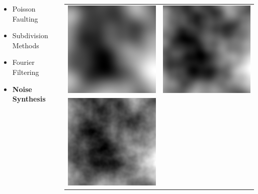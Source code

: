 \documentclass[aspectratio=169]{beamer}
\newenvironment{myframe}[1][t]{\begin{frame}[#1]{\secname}{\subsecname}}{\end{frame}}
\begin{document}
	\begin{myframe}
		\begin{columns}[T]
			\begin{column}{0.45\linewidth}
				\begin{itemize}
					\item Poisson Faulting
					\item Subdivision Methods
					\item Fourier Filtering
					\item \textbf{Noise Synthesis}
				\end{itemize}
			\end{column}
			
			\begin{column}{0.5\linewidth}
				\vspace{-1.5em}
				\begin{tabular}{lr}
					\includegraphics[width=0.35\linewidth]{images/background/generation/pnoise-1} &
					\includegraphics[width=0.35\linewidth]{images/background/generation/pnoise-2} \\
					\includegraphics[width=0.35\linewidth]{images/background/generation/pnoise-4} &

\end{tabular}
\end{column}
\end{columns}
\end{myframe}
\end{document}
